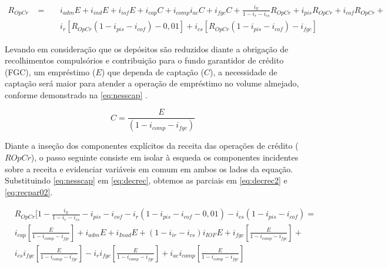 \documentclass[
  12pt,
  12pt,
  openright,
  oneside,
  a4paper,
  chapter=TITLE,
  section=TITLE,
  subsection=TITLE,
  subsubsection=TITLE,
  english,
  portugues,
  sumario=tradicional]{abntex2}
\begin{document}
\begin{apendicesenv}
\begin{equation}\label{eq:decrec}
\begin{aligned}
R_{OpCr} \hspace{10pt} = \hspace{10pt} &  i_{adm}E + i_{ind}E + i_{iof}E + i_{cap}C + i_{comp}i_{ac}C + i_{fgc}C + \frac{i_{ll}}{1 - i_{r} - i_{cs}}R_{OpCr} + i_{pis}R_{OpCr} + i_{cof}R_{OpCr} + \\ 
& i_{r} [R_{OpCr}(1-i_{pis} - i_{cof}) - 0,01] + i_{cs} [R_{OpCr}(1-i_{pis} - i_{cof}) - i_{fgc}]
\end{aligned}
\end{equation}


Levando em consideração que os depósitos são reduzidos diante a obrigação de recolhimentos compulsórios e contribuição para o fundo garantidor de crédito (FGC), um empréstimo ($E$) que dependa de captação ($C$), a necessidade de captação será maior para atender a operação de empréstimo no volume almejado, conforme demonstrado na \autoref{eq:nesscap} \cite{cardoso:1999}.


\begin{equation}\label{eq:nesscap}
C = \frac{E}{(1 - i_{comp} - i_{fgc})}
\end{equation}


Diante a inseção dos componentes explícitos da receita das operações de crédito ($ROpCr$), o passo seguinte consiste em isolar à esqueda os componentes incidentes sobre a receita e evidenciar variáveis em comum em ambos os lados da equação. Substituindo \autoref{eq:nesscap} em \autoref{eq:decrec}, obtemos as parciais em \autoref{eq:decrec2} e \autoref{eq:recpar02}. 


\begin{equation}\label{eq:decrec2}
\begin{aligned}
& R_{OpCr}[1 - \frac{i_{ll}}{1 - i_{r} - i_{cs}} - i_{pis} - i_{cof} - i_{r} (1-i_{pis} - i_{cof} - 0,01) - i_{cs} (1-i_{pis} - i_{cof}) = \\
& i_{cap}[\frac{E}{1 - i_{comp} - i_{fgc}}] + i_{adm}E + i_{Inad}E + (1 - i_{ir} - i_{cs})i_{IOF}E + i_{fgc}[\frac{E}{1 - i_{comp} - i_{fgc}}] + \\ & i_{cs}i_{fgc}[\frac{E}{1 - i_{comp} - i_{fgc}}] - 
i_{r}i_{fgc}[\frac{E}{1 - i_{comp} - i_{fgc}}] + i_{ac}i_{comp}[\frac{E}{1 - i_{comp} - i_{fgc}}]
\end{aligned}
\end{equation}




\end{apendicesenv}
\end{document}
